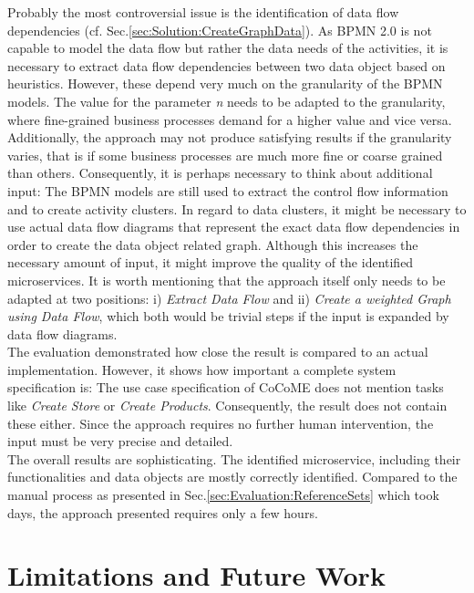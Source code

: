 Probably the most controversial issue is the identification of data flow dependencies (cf. Sec.\ref{sec:Solution:CreateGraphData}). As BPMN 2.0 is not capable to model the data flow but rather the data needs of the activities, it is necessary to extract data flow dependencies between two data object based on heuristics. However, these depend very much on the granularity of the BPMN models. The value for the parameter \textit{n} needs to be adapted to the granularity, where fine-grained business processes demand for a higher value and vice versa. Additionally, the approach may not produce satisfying results if the granularity varies, that is if some business processes are much more fine or coarse grained than others. Consequently, it is perhaps necessary to think about additional input: The BPMN models are still used to extract the control flow information and to create activity clusters. In regard to data clusters, it might be necessary to use actual data flow diagrams that represent the exact data flow dependencies in order to create the data object related graph. Although this increases the necessary amount of input, it might improve the quality of the identified microservices. It is worth mentioning that the approach itself only needs to be adapted at two positions: i) \textit{Extract Data Flow} and ii) \textit{Create a weighted Graph using Data Flow}, which both would be trivial steps if the input is expanded by data flow diagrams. \\
The evaluation demonstrated how close the result is compared to an actual implementation. However, it shows how important a complete system specification is: The use case specification of CoCoME does not mention tasks like \textit{Create Store} or \textit{Create Products}. Consequently, the result does not contain these either. Since the approach requires no further human intervention, the input must be very precise and detailed.\\
The overall results are sophisticating. The identified microservice, including their functionalities and data objects are mostly correctly identified. Compared to the manual process as presented in Sec.\ref{sec:Evaluation:ReferenceSets} which took days, the approach presented requires only a few hours. 







\section{Limitations and Future Work}







